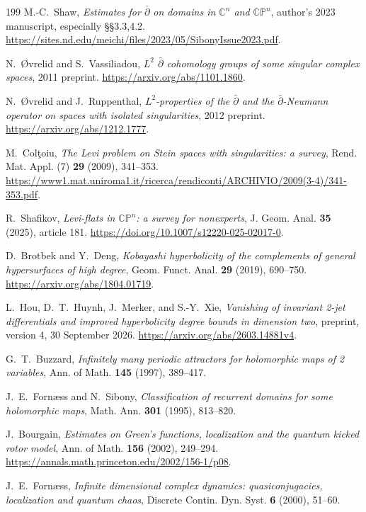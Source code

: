 \documentclass[11pt,reqno]{amsart}
\theoremstyle{definition}
\theoremstyle{remark}
\begin{document}
\begin{thebibliography}{199}
 M.-C.~Shaw, \emph{Estimates for $\bar\partial$ on domains in $\mathbb C^n$ and $\mathbb{CP}^n$}, author's 2023 manuscript, especially \S\S3.3,4.2. \url{https://sites.nd.edu/meichi/files/2023/05/SibonyIssue2023.pdf}.

 N.~\O vrelid and S.~Vassiliadou, \emph{$L^2$ $\bar\partial$ cohomology groups of some singular complex spaces}, 2011 preprint. \url{https://arxiv.org/abs/1101.1860}.

 N.~\O vrelid and J.~Ruppenthal, \emph{$L^2$-properties of the $\bar\partial$ and the $\bar\partial$-Neumann operator on spaces with isolated singularities}, 2012 preprint. \url{https://arxiv.org/abs/1212.1777}.

 M.~Col\c toiu, \emph{The Levi problem on Stein spaces with singularities: a survey}, Rend. Mat. Appl. (7) \textbf{29} (2009), 341--353. \url{https://www1.mat.uniroma1.it/ricerca/rendiconti/ARCHIVIO/2009(3-4)/341-353.pdf}.

 R.~Shafikov, \emph{Levi-flats in $\mathbb{CP}^n$: a survey for nonexperts}, J. Geom. Anal. \textbf{35} (2025), article 181. \url{https://doi.org/10.1007/s12220-025-02017-0}.

 D.~Brotbek and Y.~Deng, \emph{Kobayashi hyperbolicity of the complements of general hypersurfaces of high degree}, Geom. Funct. Anal. \textbf{29} (2019), 690--750. \url{https://arxiv.org/abs/1804.01719}.

 L.~Hou, D.~T.~Huynh, J.~Merker, and S.-Y.~Xie, \emph{Vanishing of invariant 2-jet differentials and improved hyperbolicity degree bounds in dimension two}, preprint, version 4, 30 September 2026. \url{https://arxiv.org/abs/2603.14881v4}.

 G.~T.~Buzzard, \emph{Infinitely many periodic attractors for holomorphic maps of 2 variables}, Ann. of Math. \textbf{145} (1997), 389--417.

 J.~E.~Forn\ae ss and N.~Sibony, \emph{Classification of recurrent domains for some holomorphic maps}, Math. Ann. \textbf{301} (1995), 813--820.

 J.~Bourgain, \emph{Estimates on Green's functions, localization and the quantum kicked rotor model}, Ann. of Math. \textbf{156} (2002), 249--294. \url{https://annals.math.princeton.edu/2002/156-1/p08}.

 J.~E.~Forn\ae ss, \emph{Infinite dimensional complex dynamics: quasiconjugacies, localization and quantum chaos}, Discrete Contin. Dyn. Syst. \textbf{6} (2000), 51--60.


\end{thebibliography}
\end{document}
